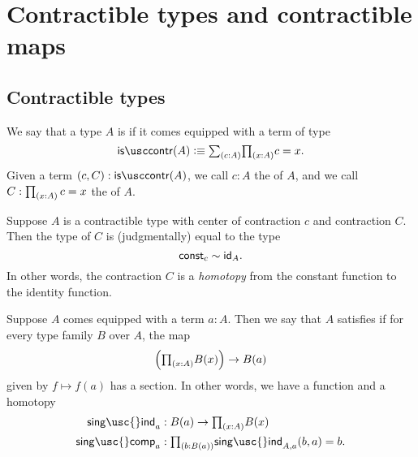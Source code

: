 
\chapter{Contractible types and contractible maps}

\section{Contractible types}

\begin{defn}
  We say that a type $A$ is  if it comes equipped with a term of type
  \begin{equation*}
    \iscontr(A) \defeq \sm{c:A}\prd{x:A}c=x.
  \end{equation*}
  Given a term $(c,C):\iscontr(A)$, we call $c:A$ the  of $A$, and we call $C:\prd{x:A}c=x$ the  of $A$.
\end{defn}

\begin{rmk}
Suppose $A$ is a contractible type with center of contraction $c$ and contraction $C$. Then the type of $C$ is (judgmentally) equal to the type
\begin{equation*}
\mathsf{const}_c\htpy\idfunc[A].
\end{equation*}
In other words, the contraction $C$ is a \emph{homotopy} from the constant function to the identity function.
\end{rmk}

\begin{defn}
  Suppose $A$ comes equipped with a term $a:A$. Then we say that $A$ satisfies  if for every type family $B$ over $A$, the map
\begin{equation*}
\Big(\prd{x:A}B(x)\Big)\to B(a)
\end{equation*}
given by $f\mapsto f(a)$ has a section. In other words, we have a function and a homotopy
\begin{align*}
\mathsf{sing\usc{}ind}_{a} & : B(a)\to \prd{x:A}B(x) \\
\mathsf{sing\usc{}comp}_{a} & : \prd{b:B(a)} \mathsf{sing\usc{}ind}_{A,a}(b,a)=b.
\end{align*}
\end{defn}

